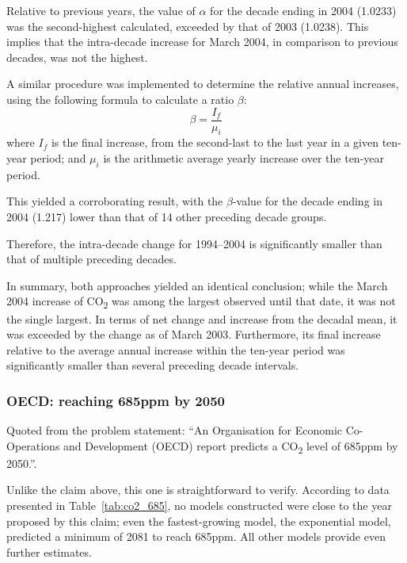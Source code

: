 \documentclass[12pt]{mcmthesis}
\begin{document}
    Relative to previous years, the value of $\alpha$ for the decade ending in 2004 (1.0233) was the second-highest calculated, exceeded by that of 2003 (1.0238). This implies that the intra-decade increase for March 2004, in comparison to previous decades, was not the highest.

    A similar procedure was implemented to determine the relative annual increases, using the following formula to calculate a ratio $\beta$:
%
    \begin{equation}
        \beta = \frac{I_f}{\mu_i}
    \end{equation}
%
    where $I_f$ is the final increase, from the second-last to the last year in a given ten-year period; and
    $\mu_i$ is the arithmetic average yearly increase over the ten-year period.

    This yielded a corroborating result, with the $\beta$-value for the decade ending in 2004 (1.217) lower than that of 14 other preceding decade groups.

    Therefore, the intra-decade change for 1994--2004 is significantly smaller than that of multiple preceding decades.



    In summary, both approaches yielded an identical conclusion; while the March 2004 increase of CO\textsubscript{2} was among the largest observed until that date, it was not the single largest. In terms of net change and increase from the decadal mean, it was exceeded by the change as of March 2003. Furthermore, its final increase relative to the average annual increase within the ten-year period was significantly smaller than several preceding decade intervals.


    \subsubsection*{OECD: reaching 685ppm by 2050}

   Quoted from the problem statement: ``An Organisation for Economic Co-Operations and Development (OECD) report predicts a CO\textsubscript{2} level of 685ppm by 2050.''.

    Unlike the claim above, this one is straightforward to verify. According to data presented in Table~\ref{tab:co2_685}, no models constructed were close to the year proposed by this claim; even the fastest-growing model, the exponential model, predicted a minimum of 2081 to reach 685ppm.
    All other models provide even further estimates.
\end{document}

